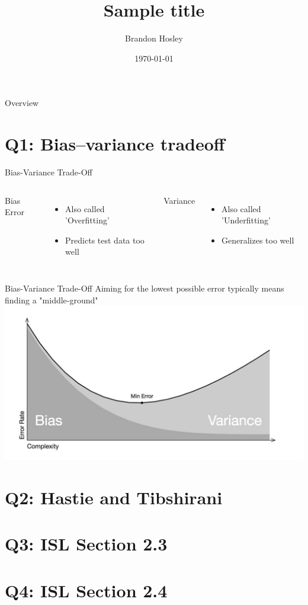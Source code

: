 \documentclass{beamer}
\title{Sample title}
\author{Brandon Hosley}
\institute{University of Illinois - Springfield}
\date{\today}
\begin{document}
\frame{\titlepage}

\begin{frame}{Overview}
\tableofcontents
\end{frame}

\section[Q1]{Q1: Bias–variance tradeoff}

\begin{frame}{Bias-Variance Trade-Off}
	\begin{columns}
		Bias Error
		\begin{itemize}
			\item<1-> Also called 'Overfitting'
			\item<4-> Predicts test data too well
		\end{itemize}
		
		Variance 
		\begin{itemize}
			\item<2-> Also called 'Underfitting'
			\item<5-> Generalizes too well
		\end{itemize}
	\end{columns}
	\centering
\end{frame}

\begin{frame}{Bias-Variance Trade-Off}
	Aiming for the lowest possible error typically means finding a "middle-ground" \\
	\includegraphics[width=0.5\linewidth]{MinError}
\end{frame}

\section[Q2]{Q2: Hastie and Tibshirani}
\section[Q3]{Q3: ISL Section 2.3}
\section[Q4]{Q4: ISL Section 2.4}
\end{document}
